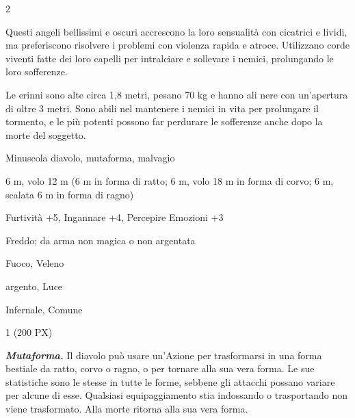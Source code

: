 \begin{multicols}{2}
{Questi angeli bellissimi e oscuri accrescono la loro sensualità con cicatrici e lividi, ma preferiscono risolvere i problemi con violenza rapida e atroce. Utilizzano corde viventi fatte dei loro capelli per intralciare e sollevare i nemici, prolungando le loro sofferenze.

Le erinni sono alte circa 1,8 metri, pesano 70 kg e hanno ali nere con un'apertura di oltre 3 metri. Sono abili nel mantenere i nemici in vita per prolungare il tormento, e le più potenti possono far perdurare le sofferenze anche dopo la morte del soggetto.

\begin{description}[noitemsep, topsep=0pt, parsep=0pt, partopsep=0pt, itemsep=1pt, leftmargin=2.35cm,  labelwidth=2.2cm, itemindent=0cm, listparindent=0pt] %
\setlength{\baselineskip}{10pt}
\item[\textbf{Taglia/Tipo}] Minuscola diavolo, mutaforma, malvagio
\item[\textbf{Caratt.}] 
\item[\textbf{Punti Ferita}] 
\item[\textbf{Movimento}] 6 m, volo 12 m (6 m in forma di ratto; 6 m, volo 18 m in forma di corvo; 6 m, scalata 6 m in forma di ragno)
\item[\textbf{Tiri Salvez.}] 
\item[\textbf{Comp.}] Furtività +5, Ingannare +4, Percepire Emozioni +3
\item[\textbf{Res. Danni}] Freddo; da arma non magica o non argentata
\item[\textbf{Imm. Danni}] Fuoco, Veleno
\item[\textbf{Vulnerabilità}] argento, Luce
\item[\textbf{Sensi}] 
\item[\textbf{Linguaggi}] Infernale, Comune
\item[\textbf{Sfida}] 1 (200 PX)
\end{description}
\smallskip

\emph{\textbf{Mutaforma.}} Il diavolo può usare un'Azione per trasformarsi in una forma bestiale da ratto, corvo o ragno, o per tornare alla sua vera forma. Le sue statistiche sono le stesse in tutte le forme, sebbene gli attacchi possano variare per alcune di esse. Qualsiasi equipaggiamento stia indossando o trasportando non viene trasformato. Alla morte ritorna alla sua vera forma.

}
\end{multicols}
